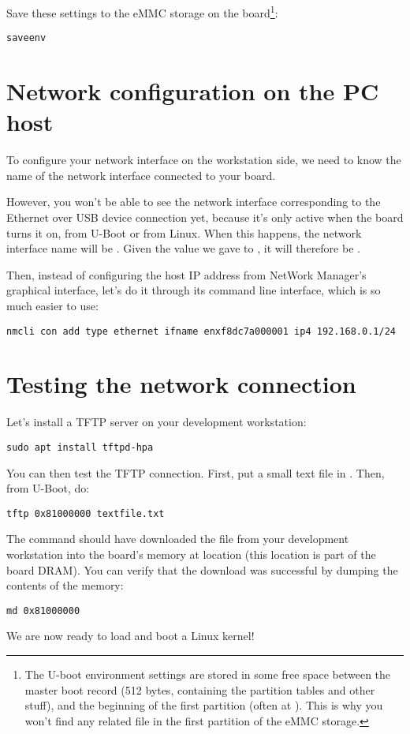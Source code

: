 Save these settings to the eMMC storage on the board\footnote{
The U-boot environment settings are stored in some free space
between the master boot record (512 bytes, containing the partition
tables and other stuff), and the beginning of the first partition (often
at ). This is why you won't find any related file in the
first partition of the eMMC storage.}:

\begin{verbatim}
saveenv
\end{verbatim}

\section{Network configuration on the PC host}

To configure your network interface on the workstation side, we need
to know the name of the network interface connected to your board.

However,  you won't be able to see the network interface corresponding
to the Ethernet over USB device connection yet, because it's only active when
the board turns it on, from U-Boot or from Linux. When this
happens, the network interface name will be .
Given the value we gave to , it will
therefore be .

Then, instead of configuring the host IP address from NetWork Manager's
graphical interface, let's do it through its command line interface,
which is so much easier to use:

\begin{verbatim}
nmcli con add type ethernet ifname enxf8dc7a000001 ip4 192.168.0.1/24
\end{verbatim}

\section{Testing the network connection}

Let's install a TFTP server on your development workstation:

\begin{verbatim}
sudo apt install tftpd-hpa
\end{verbatim}

You can then test the TFTP connection.  First, put a small text
file in . Then, from U-Boot, do:

\begin{verbatim}
tftp 0x81000000 textfile.txt
\end{verbatim}

The  command should have downloaded the
 file from your development workstation into the
board's memory at location  (this location is part of
the board DRAM). You can verify that the download was successful by
dumping the contents of the memory:

\begin{verbatim}
md 0x81000000
\end{verbatim}

We are now ready to load and boot a Linux kernel!
